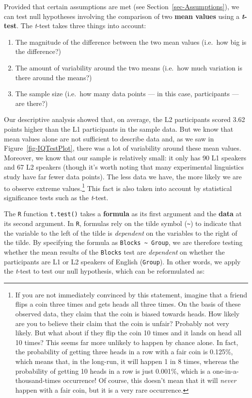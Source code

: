 \documentclass[
  letterpaper,
  DIV=11,
  numbers=noendperiod]{scrreprt}
\providecommand{\tightlist}{%
  \setlength{\itemsep}{0pt}\setlength{\parskip}{0pt}}
\begin{document}
Provided that certain assumptions are met (see
Section~\ref{sec-Assumptions}), we can test null hypotheses involving
the comparison of two \textbf{mean values} using a
\textbf{\emph{t}-test}. The \emph{t}-test takes three things into
account:

\begin{enumerate}
\def\labelenumi{\arabic{enumi}.}
\tightlist
\item
  The magnitude of the difference between the two mean values (i.e.~how
  big is the difference?)
\item
  The amount of variability around the two means (i.e.~how much
  variation is there around the means?)
\item
  The sample size (i.e.~how many data points --- in this case,
  participants --- are there?)
\end{enumerate}

Our descriptive analysis showed that, on average, the L2 participants
scored 3.62 points higher than the L1 participants in the sample data.
But we know that mean values alone are not sufficient to describe data
and, as we saw in Figure~\ref{fig-IQTestPlot}, there was a lot of
variability around these mean values. Moreover, we know that our sample
is relatively small: it only has 90 L1 speakers and 67 L2 speakers
(though it's worth noting that many experimental linguistics study have
far fewer data points). The less data we have, the more likely we are to
observe extreme values.\footnote{If you are not immediately convinced by
  this statement, imagine that a friend flips a coin three times and
  gets heads all three times. On the basis of these observed data, they
  claim that the coin is biased towards heads. How likely are you to
  believe their claim that the coin is unfair? Probably not very likely.
  But what about if they flip the coin 10 times and it lands on head all
  10 times? This seems far more unlikely to happen by chance alone. In
  fact, the probability of getting three heads in a row with a fair coin
  is 0.125\%, which means that, in the long-run, it will happen 1 in 8
  times, whereas the probability of getting 10 heads in a row is just
  0.001\%, which is a one-in-a-thousand-times occurrence! Of course,
  this doesn't mean that it will \emph{never} happen with a fair coin,
  but it is a very rare occurrence.} This fact is also taken into
account by statistical significance tests such as the \emph{t}-test.

The \texttt{R} function \texttt{t.test()} takes a \textbf{formula} as
its first argument and the \textbf{data} at its second argument. In
\texttt{R}, formulas rely on the tilde symbol
(\texttt{\textasciitilde{}}) to indicate that the variable to the left
of the tilde is \emph{dependent} on the variables to the right of the
tilde. By specifying the formula as
\texttt{Blocks\ \textasciitilde{}\ Group}, we are therefore testing
whether the mean results of the \texttt{Blocks} test are
\emph{dependent} on whether the participants are L1 or L2 speakers of
English (\texttt{Group}). In other words, we apply the \emph{t}-test to
test our null hypothesis, which can be reformulated as:
\end{document}
